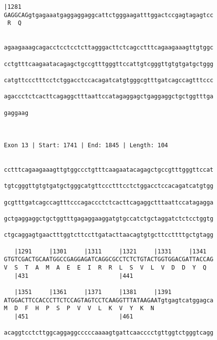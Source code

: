 \documentclass{article}
\begin{document}
\begin{Verbatim}
|1281                                                       
GAGGCAGgtgagaaatgaggaggaggcattctgggaagatttggactccgagtagagtcc
 R  Q                                                       
                                                            
  
agaagaaagcagacctcctcctcttagggacttctcagcctttcagaagaaagttgtggc
                                                            
cctgtttcaagaatacagagctgccgtttgggttccattgtcgggttgtgtgatgctggg
                                                            
catgttccctttcctctggacctccacagatcatgtgggcgtttgatcagccagtttccc
                                                            
agaccctctcacttcagaggctttaattccatagaggagctgaggaggctgctggtttga
                                                            
gaggaag
       
       
 
Exon 13 | Start: 1741 | End: 1845 | Length: 104


cctttcagaagaaagttgtggccctgtttcaagaatacagagctgccgtttgggttccat
                                                            
tgtcgggttgtgtgatgctgggcatgttccctttcctctggacctccacagatcatgtgg
                                                            
gcgtttgatcagccagtttcccagaccctctcacttcagaggctttaattccatagagga
                                                            
gctgaggaggctgctggtttgagaggaaggatgtgccatctgctaggatctctcctggtg
                                                            
ctgcaggagtgaactttggtcttccttgatacttaacagtgtgcttccttttgctgtagg
                                                            
   |1291     |1301     |1311     |1321     |1331     |1341  
GTGTCGACTGCAATGGCCGAGGAGATCAGGCGCCTCTCTGTACTGGTGGACGATTACCAG
V  S  T  A  M  A  E  E  I  R  R  L  S  V  L  V  D  D  Y  Q  
   |431                          |441                       
  
   |1351     |1361     |1371     |1381     |1391            
ATGGACTTCCACCCTTCTCCAGTAGTCCTCAAGGTTTATAAGAATgtgagtcatggagca
M  D  F  H  P  S  P  V  V  L  K  V  Y  K  N                 
   |451                          |461                       
  
acaggtcctcttggcaggaggcccccaaaagtgattcaacccctgttggtctgggtcagg
                                                            

\end{Verbatim}
\end{document}
